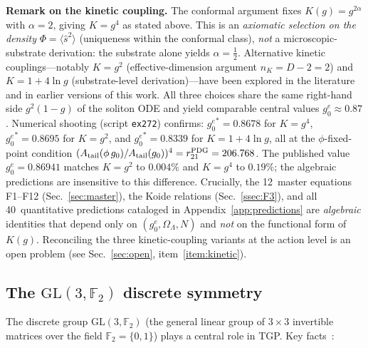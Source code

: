 \documentclass[aps,prd,twocolumn,superscriptaddress,showpacs,
  nofootinbib,floatfix,longbibliography]{revtex4-2}
\newcommand{\gone}{{g_0^e}}
\newcommand{\OL}{\Omega_\Lambda}
\newcommand{\GL}{\mathrm{GL}(3,\mathbb{F}_2)}
\begin{document}
\textbf{Remark on the kinetic coupling.}
The conformal argument fixes $K(g) = g^{2\alpha}$ with $\alpha = 2$,
giving $K = g^4$ as stated above.  This is an \emph{axiomatic selection on
the density} $\Phi=\langle\hat s^2\rangle$ (uniqueness within the conformal
class), \emph{not} a microscopic-substrate derivation: the substrate alone
yields $\alpha=\tfrac12$.  Alternative kinetic couplings---notably
$K = g^2$ (effective-dimension argument $n_{K} = D{-}2 = 2$) and
$K = 1 + 4\ln g$ (substrate-level derivation)---have been explored in
the literature and in earlier versions of this work.  All three choices
share the same right-hand side $g^2(1-g)$ of the soliton ODE and yield
comparable central values $\gone \approx 0.87$.
Numerical shooting (script \texttt{ex272}) confirms:
$\gone^* = 0.8678$ for $K = g^4$,
$\gone^* = 0.8695$ for $K = g^2$, and
$\gone^* = 0.8339$ for $K = 1{+}4\ln g$,
all at the $\phi$-fixed-point condition
$(A_\mathrm{tail}(\phi\,g_0)/A_\mathrm{tail}(g_0))^4 = r_{21}^{\rm PDG}
 = 206.768$.
The published value $\gone = 0.86941$ matches $K = g^2$ to $0.004\%$
and $K = g^4$ to $0.19\%$; the algebraic predictions are insensitive
to this difference.
Crucially, the 12~master equations F1--F12 (Sec.~\ref{sec:master}),
the Koide relations (Sec.~\ref{ssec:F3}), and all 40~quantitative
predictions cataloged in Appendix~\ref{app:predictions} are
\emph{algebraic} identities that depend only on $(\gone, \OL, N)$
and \emph{not} on the functional form of $K(g)$.
Reconciling the three kinetic-coupling variants at the action level
is an open problem (see Sec.~\ref{sec:open}, item~\ref{item:kinetic}).


\subsection{The \texorpdfstring{$\GL$}{GL(3,F2)} discrete
  symmetry}\label{ssec:gl3f2}

The discrete group $\GL$ (the general linear group of $3 \times 3$
invertible matrices over the field $\mathbb{F}_2 = \{0, 1\}$) plays a
central role in TGP. Key facts~\cite{GL3F2,Dickson1901}:
\end{document}
